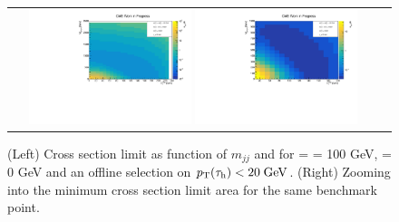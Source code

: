 \begin{figure}[tbh!]
	\centering
	\begin{tabular}{cc}
		\includegraphics[width=0.45\textwidth]{analysis/pics/JetInvMass_vs_MET_xsec_chi100_lsp000_taupt20.pdf}
		\includegraphics[width=0.45\textwidth]{analysis/pics/JetInvMass_vs_MET_xsec_chi100_lsp000_taupt20_zoom.pdf}
	\end{tabular}
	\caption{(Left) Cross section limit as function of $m_{jj}$ and \met for \charginopm = \neutralinotwo = 100 GeV, \neutralinoone = 0 GeV and an offline selection on $p_{\text{T}}(\tau_{\text{h}}) <  20\;\text{Ge}\kern-0.06667em\text{V}$. (Right) Zooming into the minimum cross section limit area for the same benchmark point.}
	\label{fig::JetInvMass_vs_MET_xsec_chi100_lsp000_taupt20}
\end{figure}

